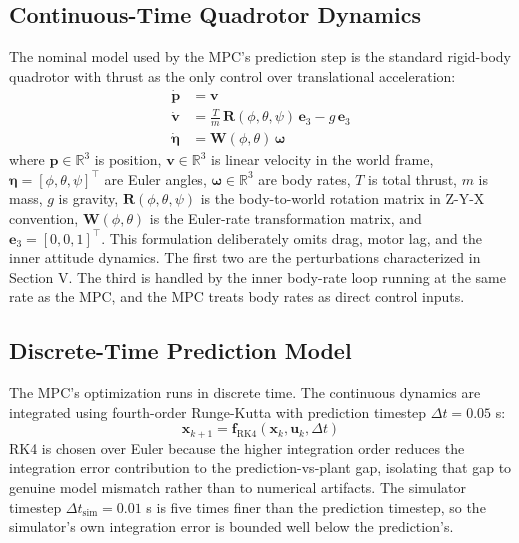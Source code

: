 \documentclass[conference]{IEEEtran}
\begin{document}
\subsection{Continuous-Time Quadrotor Dynamics}
The nominal model used by the MPC's prediction step is the standard rigid-body quadrotor with thrust as the only control over translational acceleration:
\begin{align}
\dot{\mathbf{p}} &= \mathbf{v} \tag{A.1} \\
\dot{\mathbf{v}} &= \frac{T}{m}\, \mathbf{R}(\phi, \theta, \psi)\, \mathbf{e}_3 - g\, \mathbf{e}_3 \tag{A.2} \\
\dot{\boldsymbol{\eta}} &= \mathbf{W}(\phi, \theta)\, \boldsymbol{\omega} \tag{A.3}
\end{align}
where $\mathbf{p} \in \mathbb{R}^3$ is position, $\mathbf{v} \in \mathbb{R}^3$ is linear velocity in the world frame, $\boldsymbol{\eta} = [\phi, \theta, \psi]^\top$ are Euler angles, $\boldsymbol{\omega} \in \mathbb{R}^3$ are body rates, $T$ is total thrust, $m$ is mass, $g$ is gravity, $\mathbf{R}(\phi, \theta, \psi)$ is the body-to-world rotation matrix in Z-Y-X convention, $\mathbf{W}(\phi, \theta)$ is the Euler-rate transformation matrix, and $\mathbf{e}_3 = [0, 0, 1]^\top$. This formulation deliberately omits drag, motor lag, and the inner attitude dynamics. The first two are the perturbations characterized in Section V. The third is handled by the inner body-rate loop running at the same rate as the MPC, and the MPC treats body rates as direct control inputs.

\subsection{Discrete-Time Prediction Model}
The MPC's optimization runs in discrete time. The continuous dynamics are integrated using fourth-order Runge-Kutta with prediction timestep $\Delta t = 0.05$ s:
\begin{equation}
\mathbf{x}_{k+1} = \mathbf{f}_{\text{RK4}}(\mathbf{x}_k, \mathbf{u}_k, \Delta t) \tag{A.4}
\end{equation}
RK4 is chosen over Euler because the higher integration order reduces the integration error contribution to the prediction-vs-plant gap, isolating that gap to genuine model mismatch rather than to numerical artifacts. The simulator timestep $\Delta t_{\text{sim}} = 0.01$ s is five times finer than the prediction timestep, so the simulator's own integration error is bounded well below the prediction's.
\end{document}

